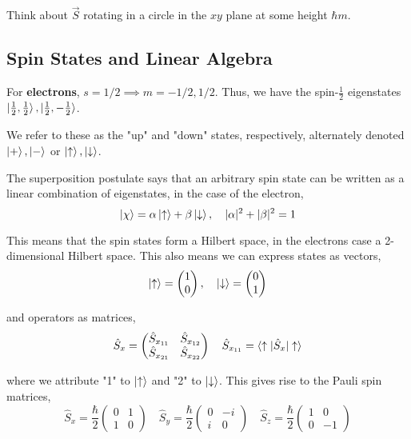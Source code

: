 \documentclass[11pt]{article}
\begin{document}
Think about $\vec{S}$ rotating in a circle in the $xy$ plane at some height $\hbar m$. 

\subsection*{Spin States and Linear Algebra}

For \textbf{electrons}, $s = 1/2 \implies m = -1/2, 1/2$. Thus, we have the spin-$\frac{1}{2}$ eigenstates $\ket{\frac{1}{2}, \frac{1}{2}} , \ket{\frac{1}{2}, -\frac{1}{2}}$.

We refer to these as the "up" and "down" states, respectively, alternately denoted $\ket{+}, \ket{-}$ or $\ket{\uparrow}, \ket{\downarrow}$.

The superposition postulate says that an arbitrary spin state can be written as a linear combination of eigenstates, in the case of the electron,
\[\ket{\chi} = \alpha \ket{\uparrow} + \beta\ket{\downarrow}, \quad |\alpha|^2 + |\beta|^2 = 1\]

This means that the spin states form a Hilbert space, in the electrons case a 2-dimensional Hilbert space. This also means we can express states as vectors,
\[\ket{\uparrow} = \begin{pmatrix} 1 \\ 0 \end{pmatrix}, \quad \ket{\downarrow} = \begin{pmatrix} 0 \\ 1 \end{pmatrix}\]

and operators as matrices,
\[\hat{S}_x = \begin{pmatrix} \hat{S}_{x_{11}} & \hat{S}_{x_{12}} \\ \hat{S}_{x_{21}} & \hat{S}_{x_{22}}\end{pmatrix} \quad \hat{S}_{x_{11}} = \braket{\uparrow | \hat{S}_x | \uparrow}\]

where we attribute "1" to $\ket{\uparrow}$ and "2" to $\ket{\downarrow}$. This gives rise to the Pauli spin matrices,
\[\hat{S}_x = \frac{\hbar}{2}\begin{pmatrix} 0 & 1 \\ 1 & 0 \end{pmatrix} \quad \hat{S}_y = \frac{\hbar}{2}\begin{pmatrix} 0 & -i \\ i & 0 \end{pmatrix} \quad \hat{S}_z = \frac{\hbar}{2}\begin{pmatrix}1 & 0 \\ 0 & -1 \end{pmatrix}\]
\end{document}

